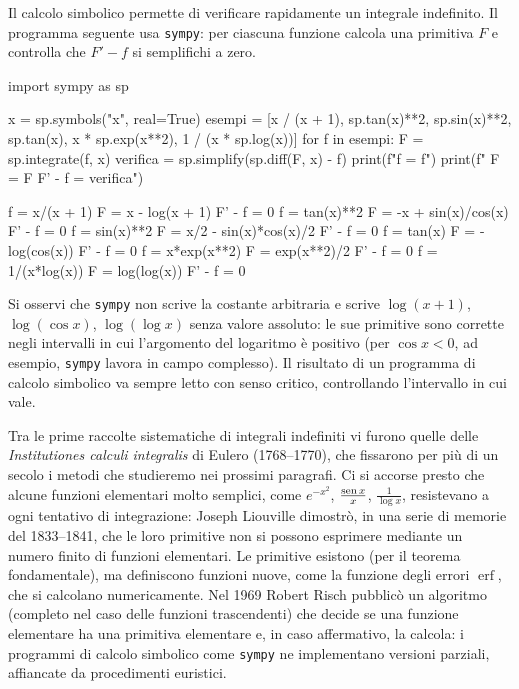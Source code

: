 Il calcolo simbolico permette di verificare rapidamente un integrale indefinito. Il
programma seguente usa \texttt{sympy}: per ciascuna funzione calcola una primitiva $F$
e controlla che $F'-f$ si semplifichi a zero.

\begin{python}
import sympy as sp

x = sp.symbols("x", real=True)
esempi = [x / (x + 1), sp.tan(x)**2, sp.sin(x)**2, sp.tan(x),
          x * sp.exp(x**2), 1 / (x * sp.log(x))]
for f in esempi:
    F = sp.integrate(f, x)
    verifica = sp.simplify(sp.diff(F, x) - f)
    print(f"f = {f}")
    print(f"    F = {F}      F' - f = {verifica}")
\end{python}
\begin{risultato}
f = x/(x + 1)
    F = x - log(x + 1)      F' - f = 0
f = tan(x)**2
    F = -x + sin(x)/cos(x)      F' - f = 0
f = sin(x)**2
    F = x/2 - sin(x)*cos(x)/2      F' - f = 0
f = tan(x)
    F = -log(cos(x))      F' - f = 0
f = x*exp(x**2)
    F = exp(x**2)/2      F' - f = 0
f = 1/(x*log(x))
    F = log(log(x))      F' - f = 0
\end{risultato}

Si osservi che \texttt{sympy} non scrive la costante arbitraria e scrive $\log(x+1)$,
$\log(\cos x)$, $\log(\log x)$ senza valore assoluto: le sue primitive sono corrette
negli intervalli in cui l'argomento del logaritmo è positivo (per $\cos x<0$, ad
esempio, \texttt{sympy} lavora in campo complesso). Il risultato di un programma di
calcolo simbolico va sempre letto con senso critico, controllando l'intervallo in cui
vale.

\begin{notastorica}
Tra le prime raccolte sistematiche di integrali indefiniti vi furono quelle delle
\emph{Institutiones calculi integralis} di Eulero (1768--1770), che fissarono per più di
un secolo i metodi che studieremo nei prossimi paragrafi. Ci si accorse presto che
alcune funzioni elementari molto semplici, come $e^{-x^{2}}$, $\frac{\operatorname{sen} x}x$, $\frac1{\log x}$,
resistevano a ogni tentativo di integrazione: Joseph Liouville dimostrò, in una serie di
memorie del 1833--1841, che le loro primitive non si possono esprimere mediante un numero
finito di funzioni elementari. Le primitive esistono (per il teorema fondamentale), ma
definiscono funzioni nuove, come la funzione degli errori $\operatorname{erf}$, che si
calcolano numericamente. Nel 1969 Robert Risch pubblicò un algoritmo (completo nel caso delle funzioni
trascendenti) che decide se una funzione elementare ha una primitiva elementare e, in
caso affermativo, la calcola: i programmi di calcolo simbolico come \texttt{sympy} ne
implementano versioni parziali, affiancate da procedimenti euristici.
\end{notastorica}
